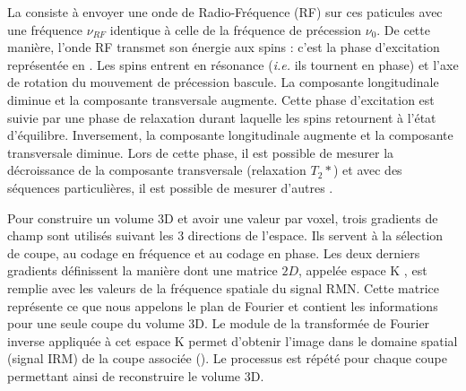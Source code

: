La \rmn consiste à envoyer une onde de Radio-Fréquence (RF) sur ces paticules 
avec une fréquence $\nu_{RF}$ identique à celle de la fréquence de précession $\nu_{0}$.
De cette manière, l'onde RF transmet son énergie aux spins : c'est la phase d'excitation représentée en .
Les spins entrent en résonance (\textit{i.e.} ils tournent en phase) et
l'axe de rotation du mouvement de précession bascule.
La composante longitudinale diminue et la composante transversale augmente.
Cette phase d'excitation est suivie par une phase de relaxation durant laquelle les spins retournent à l'état d'équilibre.
Inversement, la composante longitudinale augmente et la composante transversale diminue.
Lors de cette phase, il est possible de mesurer la décroissance de la composante transversale (relaxation $T_2*$)
et avec des séquences particulières, il est possible de mesurer d'autres .


Pour construire un volume 3D et avoir une valeur par voxel, trois gradients de champ sont utilisés suivant les 3 directions de l'espace. 
Ils servent à la sélection de coupe, au codage en fréquence et au codage en phase.
Les deux derniers gradients définissent la manière dont une matrice $2D$, 
appelée \og espace K \fg, est remplie avec les valeurs de la fréquence spatiale du signal RMN. 
Cette matrice représente ce que nous appelons \og le plan de Fourier \fg et contient les informations pour une seule coupe du volume 3D.
Le module de la transformée de Fourier inverse appliquée à cet espace K permet d'obtenir l'image dans le domaine spatial (signal IRM) 
de la coupe associée ().
Le processus est répété pour chaque coupe permettant ainsi de reconstruire le volume 3D.

